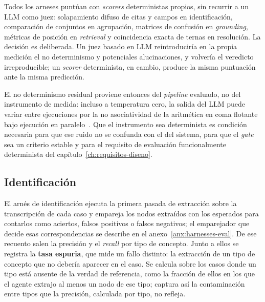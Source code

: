 Todos los arneses puntúan con \textit{scorers} deterministas propios, sin recurrir a un LLM como
juez: solapamiento difuso de citas y campos en identificación, comparación de conjuntos en
agrupación, matrices de confusión en \textit{grounding}, métricas de posición en \textit{retrieval}
y coincidencia exacta de ternas en resolución. La decisión es deliberada. Un juez basado en LLM
reintroduciría en la propia medición el no determinismo y potenciales alucinaciones, y volvería el
veredicto irreproducible; un \textit{scorer} determinista, en cambio, produce la misma puntuación
ante la misma predicción.

El no determinismo residual proviene entonces del \textit{pipeline} evaluado, no del instrumento de
medida: incluso a temperatura cero, la salida del \ac{LLM} puede variar entre ejecuciones por la
no asociatividad de la aritmética en coma flotante bajo ejecución en
paralelo~\cite{goldberg1991floating}. Que el instrumento sea determinista es condición necesaria
para que ese ruido no se confunda con el del sistema, para que el \textit{gate} sea un criterio
estable y para el requisito de evaluación funcionalmente determinista del
capítulo~\ref{ch:requisitos-diseno}.

\subsection{Identificación}

El arnés de identificación ejecuta la primera pasada de extracción sobre la transcripción de cada
caso y empareja los nodos extraídos con los esperados para contarlos como aciertos, falsos
positivos o falsos negativos; el emparejador que decide esas correspondencias se describe en el
anexo~\ref{anx:harnesses-eval}. De ese recuento salen la precisión y el \textit{recall} por tipo
de concepto. Junto a ellos se registra la \textbf{tasa espuria}, que mide un fallo distinto: la
extracción de un tipo de concepto que no debería aparecer en el caso. Se calcula sobre los casos
donde un tipo está ausente de la verdad de referencia, como la fracción de ellos en los que el
agente extrajo al menos un nodo de ese tipo; captura así la contaminación entre tipos que la
precisión, calculada por tipo, no refleja.

